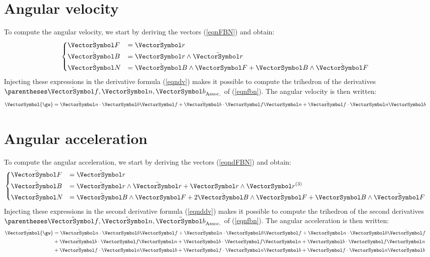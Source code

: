 \documentclass[10pt, a4paper, twoside]{basestyle}
\begin{document}
\section*{Angular velocity}
To compute the angular velocity, we start by deriving the vectors (\ref{eqnFBN}) and obtain:
\begin{equation}
\begin{dcases}
\dot{\vF} &= \dot{\vr} \\
\dot{\vB} &= \vr \wedge \ddot{\vr} \\
\dot{\vN} &= \dot{\vB} \wedge \vF + \vB \wedge \dot{\vF}
\end{dcases}
\label{eqndFBN}
\end{equation}
Injecting these expressions in the derivative formula (\ref{eqndv}) makes it possible to compute the trihedron of the derivatives $\pa{\dot{\vf}, \dot{\vn}, \dot{\vb}}$ of (\ref{eqnfbn}).  The angular velocity is then written:
\[
\VectorSymbol{\gw} = \pascal{\scal{\dot{\vn}}{\vb}} \vf + \pascal{\scal{\dot{\vb}}{\vf}} \vn + \pascal{\scal{\dot{\vf}}{\vn}} \vb
\]

\section*{Angular acceleration}
To compute the angular acceleration, we start by deriving the vectors (\ref{eqndFBN}) and obtain:
\begin{equation}
\begin{dcases}
\ddot{\vF} &= \ddot{\vr} \\
\ddot{\vB} &= \dot{\vr} \wedge \ddot{\vr} + \vr \wedge \vr^{(3)} \\
\ddot{\vN} &= \ddot{\vB} \wedge \vF + 2 \dot{\vB} \wedge \dot{\vF} + \vB \wedge \ddot{\vF} \\
\end{dcases}
\label{eqnddFBN}
\end{equation}
Injecting these expressions in the second derivative formula (\ref{eqnddv}) makes it possible to compute the trihedron of the second derivatives $\pa{\ddot{\vf}, \ddot{\vn}, \ddot{\vb}}$ of (\ref{eqnfbn}).  The angular acceleration is then written:
\begin{align*}
\dot{\VectorSymbol{\gw}} &= \pascal{\scal{\ddot{\vn}}{\vb}} \vf + \pascal{\scal{\dot{\vn}}{\dot{\vb}}} \vf + \pascal{\scal{\dot{\vn}}{\vb}} \dot{\vf} \\
&+ \pascal{\scal{\ddot{\vb}}{\vf}} \vn + \pascal{\scal{\dot{\vb}}{\dot{\vf}}} \vn + \pascal{\scal{\dot{\vb}}{\vf}} \dot{\vn} \\
&+ \pascal{\scal{\ddot{\vf}}{\vn}} \vb + \pascal{\scal{\dot{\vf}}{\dot{\vn}}} \vb + \pascal{\scal{\dot{\vf}}{\vn}} \dot{\vb}
\end{align*}
\end{document}
